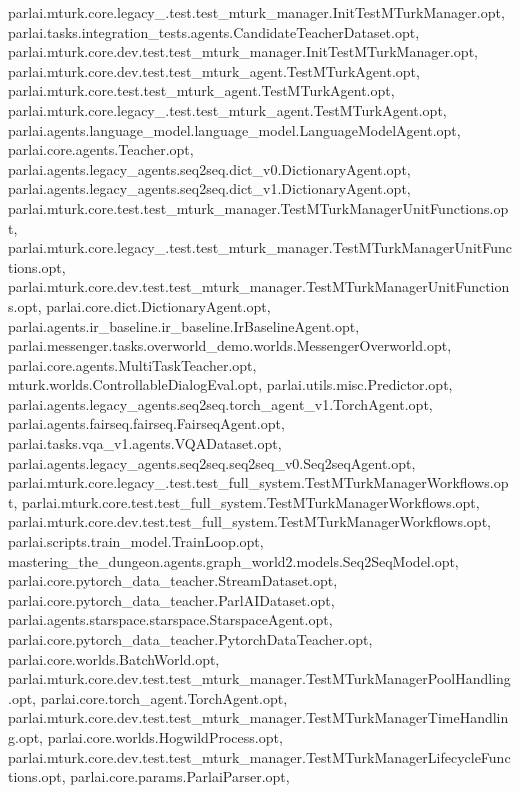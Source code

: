 parlai.\+mturk.\+core.\+legacy\+\_.\+test.\+test\+\_\+mturk\+\_\+manager.\+Init\+Test\+M\+Turk\+Manager.\+opt, parlai.\+tasks.\+integration\+\_\+tests.\+agents.\+Candidate\+Teacher\+Dataset.\+opt, parlai.\+mturk.\+core.\+dev.\+test.\+test\+\_\+mturk\+\_\+manager.\+Init\+Test\+M\+Turk\+Manager.\+opt, parlai.\+mturk.\+core.\+dev.\+test.\+test\+\_\+mturk\+\_\+agent.\+Test\+M\+Turk\+Agent.\+opt, parlai.\+mturk.\+core.\+test.\+test\+\_\+mturk\+\_\+agent.\+Test\+M\+Turk\+Agent.\+opt, parlai.\+mturk.\+core.\+legacy\+\_.\+test.\+test\+\_\+mturk\+\_\+agent.\+Test\+M\+Turk\+Agent.\+opt, parlai.\+agents.\+language\+\_\+model.\+language\+\_\+model.\+Language\+Model\+Agent.\+opt, parlai.\+core.\+agents.\+Teacher.\+opt, parlai.\+agents.\+legacy\+\_\+agents.\+seq2seq.\+dict\+\_\+v0.\+Dictionary\+Agent.\+opt, parlai.\+agents.\+legacy\+\_\+agents.\+seq2seq.\+dict\+\_\+v1.\+Dictionary\+Agent.\+opt, parlai.\+mturk.\+core.\+test.\+test\+\_\+mturk\+\_\+manager.\+Test\+M\+Turk\+Manager\+Unit\+Functions.\+opt, parlai.\+mturk.\+core.\+legacy\+\_.\+test.\+test\+\_\+mturk\+\_\+manager.\+Test\+M\+Turk\+Manager\+Unit\+Functions.\+opt, parlai.\+mturk.\+core.\+dev.\+test.\+test\+\_\+mturk\+\_\+manager.\+Test\+M\+Turk\+Manager\+Unit\+Functions.\+opt, parlai.\+core.\+dict.\+Dictionary\+Agent.\+opt, parlai.\+agents.\+ir\+\_\+baseline.\+ir\+\_\+baseline.\+Ir\+Baseline\+Agent.\+opt, parlai.\+messenger.\+tasks.\+overworld\+\_\+demo.\+worlds.\+Messenger\+Overworld.\+opt, parlai.\+core.\+agents.\+Multi\+Task\+Teacher.\+opt, mturk.\+worlds.\+Controllable\+Dialog\+Eval.\+opt, parlai.\+utils.\+misc.\+Predictor.\+opt, parlai.\+agents.\+legacy\+\_\+agents.\+seq2seq.\+torch\+\_\+agent\+\_\+v1.\+Torch\+Agent.\+opt, parlai.\+agents.\+fairseq.\+fairseq.\+Fairseq\+Agent.\+opt, parlai.\+tasks.\+vqa\+\_\+v1.\+agents.\+V\+Q\+A\+Dataset.\+opt, parlai.\+agents.\+legacy\+\_\+agents.\+seq2seq.\+seq2seq\+\_\+v0.\+Seq2seq\+Agent.\+opt, parlai.\+mturk.\+core.\+legacy\+\_.\+test.\+test\+\_\+full\+\_\+system.\+Test\+M\+Turk\+Manager\+Workflows.\+opt, parlai.\+mturk.\+core.\+test.\+test\+\_\+full\+\_\+system.\+Test\+M\+Turk\+Manager\+Workflows.\+opt, parlai.\+mturk.\+core.\+dev.\+test.\+test\+\_\+full\+\_\+system.\+Test\+M\+Turk\+Manager\+Workflows.\+opt, parlai.\+scripts.\+train\+\_\+model.\+Train\+Loop.\+opt, mastering\+\_\+the\+\_\+dungeon.\+agents.\+graph\+\_\+world2.\+models.\+Seq2\+Seq\+Model.\+opt, parlai.\+core.\+pytorch\+\_\+data\+\_\+teacher.\+Stream\+Dataset.\+opt, parlai.\+core.\+pytorch\+\_\+data\+\_\+teacher.\+Parl\+A\+I\+Dataset.\+opt, parlai.\+agents.\+starspace.\+starspace.\+Starspace\+Agent.\+opt, parlai.\+core.\+pytorch\+\_\+data\+\_\+teacher.\+Pytorch\+Data\+Teacher.\+opt, parlai.\+core.\+worlds.\+Batch\+World.\+opt, parlai.\+mturk.\+core.\+dev.\+test.\+test\+\_\+mturk\+\_\+manager.\+Test\+M\+Turk\+Manager\+Pool\+Handling.\+opt, parlai.\+core.\+torch\+\_\+agent.\+Torch\+Agent.\+opt, parlai.\+mturk.\+core.\+dev.\+test.\+test\+\_\+mturk\+\_\+manager.\+Test\+M\+Turk\+Manager\+Time\+Handling.\+opt, parlai.\+core.\+worlds.\+Hogwild\+Process.\+opt, parlai.\+mturk.\+core.\+dev.\+test.\+test\+\_\+mturk\+\_\+manager.\+Test\+M\+Turk\+Manager\+Lifecycle\+Functions.\+opt, parlai.\+core.\+params.\+Parlai\+Parser.\+opt, 